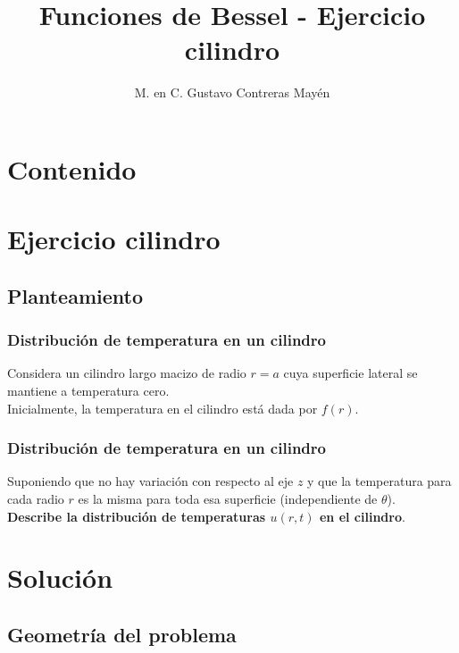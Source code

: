 \documentclass[12pt]{beamer}
\date{}
\title{Funciones de Bessel - Ejercicio cilindro}
\author{M. en C. Gustavo Contreras Mayén}
\begin{document}
\maketitle
\fontsize{14}{14}\selectfont
{}

\section*{Contenido}

\section{Ejercicio cilindro}
\subsection{Planteamiento}

\begin{frame}
\frametitle{Distribución de temperatura en un cilindro}
Considera un cilindro largo macizo de radio $r = a$ cuya superficie lateral se mantiene a temperatura cero.
\\
\bigskip
\pause
Inicialmente, la temperatura en el cilindro está dada por $f(r)$.
\end{frame}
\begin{frame}
\frametitle{Distribución de temperatura en un cilindro}    
Suponiendo que no hay variación con respecto al eje $z$ y que la temperatura para cada radio $r$ es la misma para toda esa superficie (independiente de $\theta$). 
\\
\bigskip
\pause
\textbf{Describe la distribución de temperaturas $u(r, t)$ en el cilindro}.
\end{frame}

\section{Solución}
\subsection{Geometría del problema}
\end{document}
